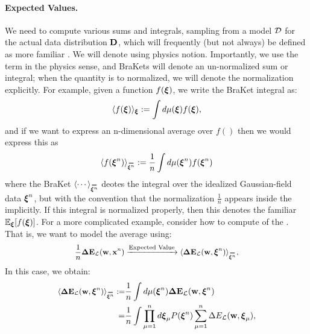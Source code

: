 \paragraph{Expected Values.}

We need to compute various sums and integrals, 
sampling from a model $\mathcal{D}$ for the actual data distribution $\mathbf{D}$,
which will frequently (but not always) be defined as more familiar \ExpectedValues.
We will denote \ExpectedValues using physics \BraKet notion.
Importantly, we use the term \ExpectedValue in the physics sense, and BraKets will denote an un-normalized sum or integral;
when the quantity is to normalized, we will denote the normalization explicitly.
For example, given a function $f(\boldsymbol{\xi})$, 
we write the BraKet integral as:
\begin{align}
 \label{eqn:EuT}
 \langle f(\boldsymbol{\xi}) \rangle_{\boldsymbol{\xi}}:=\int d\mu(\boldsymbol{\xi}) f(\boldsymbol{\xi})  ,
\end{align}
and if we want to express an n-dimensional average over $f()$ then we would express this as 
\begin{align}
    \label{eqn:EuT_normalized}
    \langle f(\NDXIn) \rangle_{\AVGNDXIn} := \frac{1}{n} \int d\mu(\NDXIn) f(\NDXIn)  
\end{align}
where the BraKet $\langle\cdots\rangle_{\AVGNDXIn}$ deotes the integral over the idealized
Gaussian-field data $\boldsymbol{\xi}^{n}$, but with the convention that the normalization $\tfrac{1}{n}$
appears inside the \BraKet implicitly.
If this integral is normalized properly, then this denotes the familiar \ExpectedValue $\mathbb{E}_{\boldsymbol{\xi}}[f(\boldsymbol{\xi})]$.
For a more complicated example, consider how to compute \ExpectedValue of the \DataSampleError.
That is, we want to model the average \DataSampleError using:
\begin{align}
  \label{eqn:Emap}
  \frac{1}{n}\DETOPX \xrightarrow{\text{Expected Value}} \langle \DETOPXI \rangle_{\AVGNDXIn}  , %
\end{align}
In this case, we obtain:
\begin{align}
\nonumber
  \langle \DETOPXI\rangle_{\AVGNDXIn}
  :=  &\frac{1}{n}\int d\mu(\NDXIn) \DETOPXI \\ 
  \label{eqn:average_data_sample_error}
  = &
  \frac{1}{n}\int \prod_{\mu=1}^{n}d\XI_{\mu}P(\NDXIn) \sum_{\mu=1}^{n}\DETmu  ,
\end{align}
